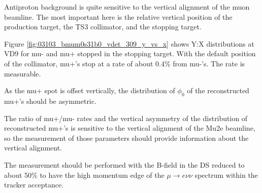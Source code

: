 \documentclass[12pt]{article}
\newcommand {\ra}        {\rightarrow}
\begin{document}
Antiproton background is quite sensitive to the vertical alignment of the muon beamline.
The most important here is the relative vertical position of the production target,
the TS3 collimator, and the stopping target.

Figure \ref{fig:03103_bmum0s31b0_vdet_309_y_vs_x} shows Y:X distributions at VD9 for mu- and mu+ stopped
in the stopping target. With the default position of the collimator, mu+'s stop at a rate of about 0.4\%
from mu-'s. The rate is measurable.

As the mu+ spot is offset vertically, the distribution of $\phi_0$  of the reconstructed mu+'s
should be asymmetric.

The ratio of mu+/mu- rates and the vertical asymmetry of the distribution of reconstructed mu+'s is 
sensitive to the vertical alignment of the Mu2e beamline, so the measurement of those parameters
should provide information about the vertical alignment.

The measurement should be performed with the B-field in the DS reduced to about 50\%
to have the high momentum edge of the $\mu \ra e\nu\nu$ spectrum within the tracker acceptance.
\end{document}
